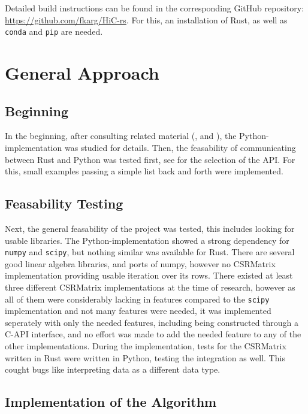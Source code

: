 Detailed build instructions can be found in the corresponding GitHub
repository: \url{https://github.com/fkarg/HiC-rs}. For this, an installation of
Rust, as well as \verb|conda| and \verb|pip| are needed.


\section{General Approach}\label{sec:approach}


\subsection{Beginning}

In the beginning, after consulting related material
(\cite{imakaev2012iterative}, \cite{lieberman2009comprehensive} and
\cite{wingett2015hicup}), the Python-implementation was studied for details.
Then, the feasability of communicating between Rust and Python was tested
first, see  for the selection of the API. For this, small
examples passing a simple list back and forth were implemented.

\subsection{Feasability Testing}

Next, the general feasability of the project was tested, this includes looking
for usable libraries. The Python-implementation showed a strong dependency for
\verb|numpy| and \verb|scipy|, but nothing similar was available for Rust.
There are several good linear algebra libraries, and ports of numpy, however no
CSRMatrix implementation providing usable iteration over its rows. There
existed at least three different CSRMatrix implementations at the time of
research, however as all of them were considerably lacking in features compared
to the \verb|scipy| implementation and not many features were needed, it was
implemented seperately with only the needed features, including being
constructed through a C-API interface, and no effort was made to add the needed
feature to any of the other implementations. During the implementation, tests
for the CSRMatrix written in Rust were written in Python, testing the
integration as well. This cought bugs like interpreting data as a different
data type.


\subsection{Implementation of the Algorithm}

